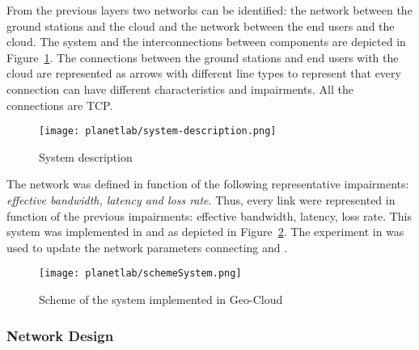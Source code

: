 From the previous layers two networks can be identified: the network between the
ground stations and the cloud and the network between the end users and the
cloud. The system and the interconnections between components are depicted in
Figure~\ref{fig:ple-system-description}. The connections between the ground stations and end users with the
cloud are represented as arrows with different line types to represent that
every connection can have different characteristics and impairments. All the
connections are \ac{TCP}.

\begin{figure}[!h]
\begin{center}
\texttt{[image: planetlab/system-description.png]}

\caption{System description}
\label{fig:ple-system-description}
\end{center}
\end{figure}

The network was defined in function of the following representative impairments: \emph{effective bandwidth, latency and loss rate}. Thus, every link were represented in function of the previous impairments: effective bandwidth, latency, loss rate.
This system was implemented in \vw and \bonfire as depicted in
Figure~\ref{fig:ple-scheme-system}. The experiment in \pl was used to update the
network parameters connecting \vw and \bonfire.

\begin{figure}[!h]
\begin{center}
\texttt{[image: planetlab/schemeSystem.png]}
\caption{Scheme of the system implemented in Geo-Cloud}
\label{fig:ple-scheme-system}
\end{center}
\end{figure}


\subsubsection{Network Design}

